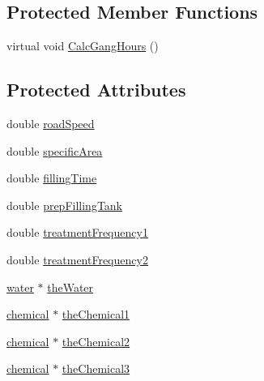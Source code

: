 \subsection*{Protected Member Functions}
\begin{DoxyCompactItemize}
\item 
virtual void \hyperlink{classplant_care_tech_a3d5338d71d9ef7b80859ac1576084d7f}{CalcGangHours} ()
\end{DoxyCompactItemize}
\subsection*{Protected Attributes}
\begin{DoxyCompactItemize}
\item 
double \hyperlink{classplant_care_tech_af6973ecf84e0cf5b8038b63ac0a37962}{roadSpeed}
\item 
double \hyperlink{classplant_care_tech_ac2b91ab06473ab299519083dc6abad7f}{specificArea}
\item 
double \hyperlink{classplant_care_tech_a6340fc154dde2944ecf687129f9068de}{fillingTime}
\item 
double \hyperlink{classplant_care_tech_afddb64cd9cee165be13d4236fde7663e}{prepFillingTank}
\item 
double \hyperlink{classplant_care_tech_a81e833c3367e43f79966c8dec40ba121}{treatmentFrequency1}
\item 
double \hyperlink{classplant_care_tech_ab7c0f81e2054bff14fe602ca34bee55b}{treatmentFrequency2}
\item 
\hyperlink{classwater}{water} $\ast$ \hyperlink{classplant_care_tech_a616e548a2ae0f4e23f2b37e1516171b9}{theWater}
\item 
\hyperlink{classchemical}{chemical} $\ast$ \hyperlink{classplant_care_tech_a851a664b2cb3f4db017fc10787534272}{theChemical1}
\item 
\hyperlink{classchemical}{chemical} $\ast$ \hyperlink{classplant_care_tech_ae3d33614c0c4b94ac6c7c23d8ebe1c59}{theChemical2}
\item 
\hyperlink{classchemical}{chemical} $\ast$ \hyperlink{classplant_care_tech_a9980093768fda818b6706513e3c8fc3e}{theChemical3}
\end{DoxyCompactItemize}



